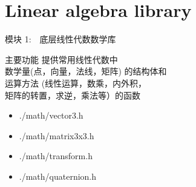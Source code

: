 \documentclass{beamer}
\begin{document}
\section{Linear algebra library}
\begin{frame} {模块 1:　底层线性代数数学库}
\begin{block}{主要功能}
    提供常用线性代数中 \\ 数学量(点，向量，法线，矩阵) 的结构体和 \\ 运算方法 (线性运算，数乘，内外积，\\ 矩阵的转置，求逆，乘法等）的函数
  \end{block}
\begin{itemize}
			\item \begin{semiverbatim}
    ./math/vector3.h
  \end{semiverbatim}
			\item \begin{semiverbatim}
    ./math/matrix3x3.h
  \end{semiverbatim}
			\item \begin{semiverbatim}
    ./math/transform.h
  \end{semiverbatim}
\item \begin{semiverbatim}
    ./math/quaternion.h
  \end{semiverbatim}
\end{itemize}
\end{frame}
\end{document}
